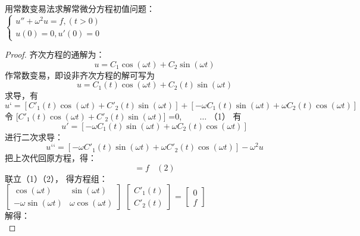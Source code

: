 \begin{example} %
	用常数变易法求解常微分方程初值问题：\\
	$\begin{cases}
		u'' +\omega ^2 u =f, (t>0)\\
		u(0)=0, u'(0)=0
	\end{cases}$
	\begin{proof} 
	齐次方程的通解为：
	\begin{equation*}
		u=C_1 \cos(\omega t)+C_2 \sin(\omega t)
	\end{equation*}     
    作常数变易，即设非齐次方程的解可写为 
	\begin{equation*}
	u=C_1(t) \cos(\omega t)+C_2(t) \sin(\omega t)
   \end{equation*}    
   求导，有
		\begin{equation*}
			u‘=[C'_1(t) \cos(\omega t)+C'_2(t) \sin(\omega t)] + [  - \omega C_1(t) \sin(\omega t)+ \omega C_2(t) \cos(\omega t)  ]
		\end{equation*}    
	令   [$C'_1(t) \cos(\omega t)+C'_2(t) \sin(\omega t)$] =0,  ~~~ $\dots$ （1） 有
	\begin{equation*}
		u'= [  - \omega C_1(t) \sin(\omega t)+ \omega C_2(t) \cos(\omega t)  ]
	\end{equation*}    
	进行二次求导：
	\begin{equation*}
		u‘‘= [  - \omega C'_1(t) \sin(\omega t)+ \omega C'_2(t) \cos(\omega t)  ] -\omega^2 u
	\end{equation*}  
   把上次代回原方程，得：
   	\begin{equation*}
   	[  - \omega C'_1(t) \sin(\omega t)+ \omega C'_2(t) \cos(\omega t)  ] =f       ~~~~  \left( 2\right)
   \end{equation*}  
联立（1）（2）， 得方程组：\\  	\vspace{0.3cm}
$\begin{bmatrix}
	 \cos(\omega t) & \sin(\omega t) \\ 
	 -\omega \sin(\omega t) & \omega\cos(\omega t)
\end{bmatrix} $
$\begin{bmatrix}
	C'_1(t)\\ 
	C'_2(t)
\end{bmatrix} $ =
$\begin{bmatrix}
	0\\ 
	f
\end{bmatrix} $ \\
解得：\\  	\vspace{0.3cm}

\end{proof}
\end{example}
